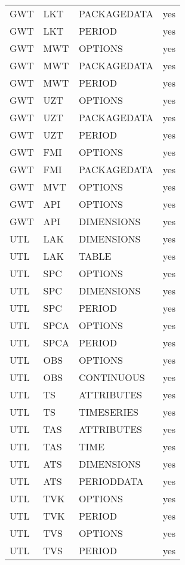 \begin{longtable}{p{1.5cm} p{1.5cm} p{3cm} c}
GWT & LKT & PACKAGEDATA & yes \\ 
GWT & LKT & PERIOD & yes \\ 
\hline
GWT & MWT & OPTIONS & yes \\ 
GWT & MWT & PACKAGEDATA & yes \\ 
GWT & MWT & PERIOD & yes \\ 
\hline
GWT & UZT & OPTIONS & yes \\ 
GWT & UZT & PACKAGEDATA & yes \\ 
GWT & UZT & PERIOD & yes \\ 
\hline
GWT & FMI & OPTIONS & yes \\ 
GWT & FMI & PACKAGEDATA & yes \\ 
\hline
GWT & MVT & OPTIONS & yes \\ 
\hline
GWT & API & OPTIONS & yes \\ 
GWT & API & DIMENSIONS & yes \\ 
\hline
UTL & LAK & DIMENSIONS & yes \\ 
UTL & LAK & TABLE & yes \\ 
\hline
UTL & SPC & OPTIONS & yes \\ 
UTL & SPC & DIMENSIONS & yes \\ 
UTL & SPC & PERIOD & yes \\ 
\hline
UTL & SPCA & OPTIONS & yes \\ 
UTL & SPCA & PERIOD & yes \\ 
\hline
UTL & OBS & OPTIONS & yes \\ 
UTL & OBS & CONTINUOUS & yes \\ 
\hline
UTL & TS & ATTRIBUTES & yes \\ 
UTL & TS & TIMESERIES & yes \\ 
\hline
UTL & TAS & ATTRIBUTES & yes \\ 
UTL & TAS & TIME & yes \\ 
\hline
UTL & ATS & DIMENSIONS & yes \\ 
UTL & ATS & PERIODDATA & yes \\ 
\hline
UTL & TVK & OPTIONS & yes \\ 
UTL & TVK & PERIOD & yes \\ 
\hline
UTL & TVS & OPTIONS & yes \\ 
UTL & TVS & PERIOD & yes \\ 


\hline
\end{longtable}
\label{table:blocks}
\normalsize
